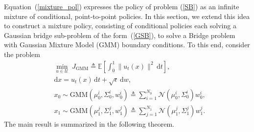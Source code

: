 \documentclass[twoside]{article}
\renewcommand{\eqref}[1]{(\ref{#1})}
\newcommand{\gmm}{\mathrm{GMM}}
\newcommand{\N}{\mathcal{N}}
\renewcommand{\E}{\mathbb{E}}
\renewcommand{\d}{\mathrm{d}}
\begin{document}
Equation~\eqref{mixture_pol} expresses the policy of problem \eqref{SB} as an infinite mixture of conditional, point-to-point policies. 
In this section, we extend this idea to construct a mixture policy, consisting of conditional policies each solving a Gaussian bridge sub-problem of the 
form~\eqref{GSB}, to solve a Bridge problem with Gaussian Mixture Model (GMM) boundary conditions. 
To this end, consider the problem
%
\begin{subequations} \label{GMM_SB}
\begin{align}
& \min_{u \in \mathcal{U}} \; J_{\mathrm{GMM}} \triangleq \E \left[ \int_{0}^{1}{ \| u_t(x) \|^2 \,
\d t} \right], \label{GMM_SB:cost} \\
& \d x = u_t(x) \, \d t + \sqrt{\epsilon} \, \d w, \label{GMM_SB:dyn} \\
& x_0 \sim \gmm(\mu^i_0, \Sigma^i_0, w_0^i) \triangleq \sum_{i=1}^{N_0} \N (\mu_0^i, \Sigma_0^i) w_0^i ,
\label{GMM_SB:BC0}\\
& 
x_1 \sim \gmm( \mu^j_1, \Sigma^j_1, w_1^j)  \triangleq  \sum_{j=1}^{N_1} \N (\mu_1^j, \Sigma_1^j) w_1^j    .  \label{GMM_SB:BC1}
\end{align}
\end{subequations}
%
%
The main result is summarized in the following theorem. 
%
\end{document}
